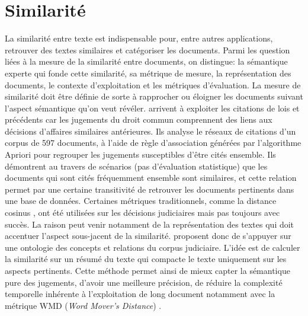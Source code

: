 \section{Similarité}

La similarité entre texte est indispensable pour, entre autres applications, retrouver des textes similaires et catégoriser les documents. Parmi les question liées à la mesure de la similarité entre documents, on distingue: la sémantique experte qui fonde cette similarité, sa métrique de mesure, la représentation des documents, le contexte d'exploitation et les métriques d'évaluation. La  mesure de similarité doit être définie de sorte à rapprocher ou éloigner les documents suivant l'aspect sémantique qu'on veut révéler. \citet{nair2018judgsimassorule} arrivent à exploiter les citations de lois et précédents car les jugements du droit commun comprennent des liens aux décisions d'affaires similaires antérieures. Ils analyse le réseaux de citations d'un corpus de 597 documents, à l'aide de règle d'association générées par l'algorithme Apriori pour regrouper les jugements susceptibles d'être cités ensemble. Ils démontrent au travers de scénarios (pas d'évaluation statistique) que les documents qui sont cités fréquemment ensemble sont similaires, et cette relation permet par une certaine transitivité de retrouver les documents pertinents dans une base de données. Certaines métriques traditionnels, comme la distance cosinus \citep{thenmozhi2017legalprecedretriev}, ont été utilisées sur les décisions judiciaires mais pas toujours avec succès. La raison peut venir notamment de la représentation des textes qui doit accentuer l'aspect sous-jacent de la similarité. \citet{ma2018wmdchinesecase} proposent donc de s'appuyer sur une ontologie des concepts et relations du corpus judiciaire. L'idée est de calculer la similarité sur un résumé du texte qui compacte le texte uniquement sur les aspects pertinents. Cette méthode permet ainsi de mieux capter la sémantique pure des jugements, d'avoir une meilleure précision, de réduire la complexité temporelle inhérente à l'exploitation de long document notamment avec la métrique WMD (\textit{Word Mover's Distance}) \citep{kusner2015wordmoverdist}.


